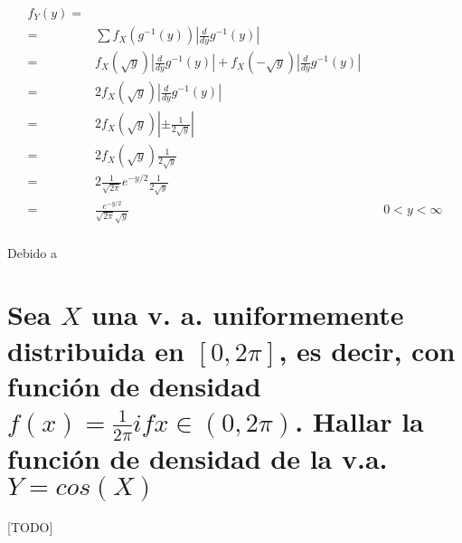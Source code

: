 \documentclass{article}
\begin{document}
    \begin{align}
      f_Y (y) =& &\\
              =& \sum f_X \left( g^{-1} (y) \right) \left| \frac{d}{dy} g^{-1} (y) \right| &\\
              =& f_X \left( \sqrt{y} \right) \left| \frac{d}{dy} g^{-1} (y) \right| + f_X \left( - \sqrt{y} \right) \left| \frac{d}{dy} g^{-1} (y) \right| &\\
              =& 2f_X \left( \sqrt{y} \right) \left| \frac{d}{dy} g^{-1} (y) \right| &\\
              =& 2f_X \left( \sqrt{y} \right) \left| \pm \frac{1}{2\sqrt{y}} \right| &\\
              =& 2f_X \left( \sqrt{y} \right) \frac{1}{2\sqrt{y}} &\\
              =& 2\frac{1}{\sqrt{2\pi} } e^{-y/2} \frac{1}{2\sqrt{y}}  & \\
              =& \frac{e^{-y/2}}{ \sqrt{2\pi} \sqrt{y} } & \quad 0<y<\infty
    \end{align}

    \paragraph{}
    Debido a

  \section{Sea $X$ una v. a. uniformemente distribuida en $[0,2\pi]$, es decir, con función de densidad $f(x)=\frac{1}{2\pi} if x \in (0,2\pi)$. Hallar la función de densidad de la v.a. $Y = cos(X)$}

    \paragraph{}
    [TODO]

  \nocite{prob2017}

  
  
\end{document}
